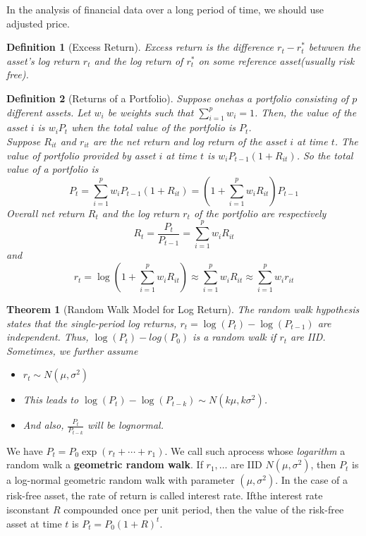 \documentclass[11pt]{article}
\newtheorem{definition}{Definition}[section]
\newtheorem{theorem}{Theorem}[section]
\theoremstyle{definition}
\begin{document}
In the analysis of financial data over a long period of time, we should use adjusted price.
\begin{definition}[Excess Return]
\normalfont Excess return is the difference $r_t-r_t^\ast$ betwwen the asset's log return $r_t$ and the log return of $r_t^\ast$ on some reference asset(usually risk free).
\end{definition}
\begin{definition}[Returns of a Portfolio]
\normalfont Suppose onehas a portfolio consisting of $p$ different assets. Let $w_i$ be weights such that $\sum_{i=1}^p w_i = 1$. Then, the value of the asset $i$ is $w_iP_t$ when the total value of the portfolio is $P_t$.\\
Suppose $R_{it}$ and $r_{it}$ are the net return and log return of the asset $i$ at time $t$. The value of portfolio provided by asset $i$ at time $t$ is $w_iP_{t-1}(1+R_{it})$. So the total value of a portfolio is
\[
P_t=\sum_{i=1}^p w_{i}P_{t-1}(1+R_{it}) = (1+\sum_{i=1}^p w_iR_{it})P_{t-1}
\]
Overall net return $R_t$ and the log return $r_t$ of the portfolio are respectively
\[
R_t=\frac{P_t}{P_{t-1}}=\sum_{i=1}^p w_iR_{it}
\]
and
\[
r_t=\log(1+\sum_{i=1}^p w_iR_{it})\approx \sum_{i=1}^p w_iR_{it} \approx\sum_{i=1}^p w_ir_{it}
\]
\end{definition}
\begin{theorem}[Random Walk Model for Log Return]
\normalfont The random walk hypothesis states that the single-period log returns, $r_t=\log(P_t)-\log(P_{t-1})$ are independent. Thus, $\log(P_t) - log(P_0)$ is a random walk if $r_t$ are IID.\\
Sometimes, we further assume
\begin{itemize}
  \item $r_t\sim N(\mu, \sigma^2)$
  \item This leads to $\log(P_t)-\log(P_{t-k})\sim N(k\mu,k\sigma^2)$.
  \item And also, $\frac{P_t}{P_{t-k}}$ will be lognormal.
\end{itemize}
\end{theorem}
We have $P_t=P_0\exp(r_t+\cdots +r_1)$. We call such aprocess whose \textit{logarithm} a random walk a \textbf{geometric random walk}. If $r_1,\ldots$ are IID $N(\mu,\sigma^2)$, then $P_t$ is a log-normal geometric random walk with parameter $(\mu, \sigma^2)$.
In the case of a risk-free asset, the rate of return is called interest rate. Ifthe interest rate isconstant $R$ compounded once per unit period, then the value of the risk-free asset at time $t$ is $P_t=P_0(1+R)^t$.
\end{document}
